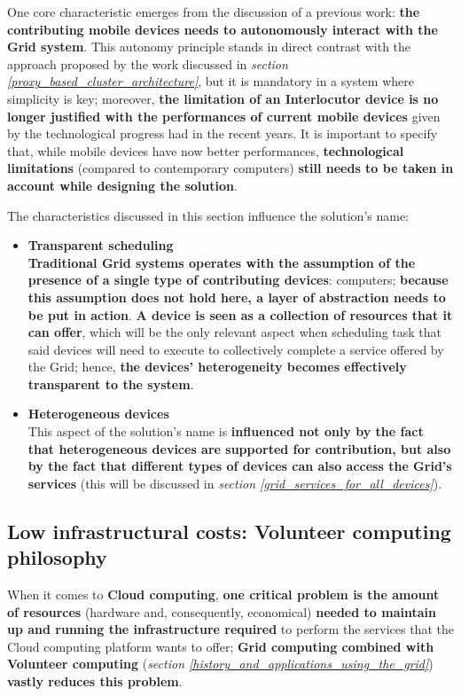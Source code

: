 One core characteristic emerges from the discussion of a previous work: \textbf{the contributing mobile devices needs to autonomously interact with the Grid system}.
This autonomy principle stands in direct contrast with the approach proposed by the work discussed in \textit{section \ref{proxy_based_cluster_architecture}}, but it is mandatory in a system where simplicity is key; moreover, \textbf{the limitation of an Interlocutor device is no longer justified with the performances of current mobile devices} given by the technological progress had in the recent years. It is important to specify that, while mobile devices have now better performances, \textbf{technological limitations} (compared to contemporary computers) \textbf{still needs to be taken in account while designing the solution}.

The characteristics discussed in this section influence the solution's name:
\begin{itemize}
    \item \textbf{Transparent scheduling}\\
    \textbf{Traditional Grid systems operates with the assumption of the presence of a single type of contributing devices}: computers; \textbf{because this assumption does not hold here, a layer of abstraction needs to be put in action}. \textbf{A device is seen as a collection of resources that it can offer}, which will be the only relevant aspect when scheduling task that said devices will need to execute to collectively complete a service offered by the Grid; hence, \textbf{the devices' heterogeneity becomes effectively transparent to the system}.
    \item \textbf{Heterogeneous devices}\\
    This aspect of the solution's name is \textbf{influenced not only by the fact that heterogeneous devices are supported for contribution, but also by the fact that different types of devices can also access the Grid's services} (this will be discussed in \textit{section \ref{grid_services_for_all_devices}}).
\end{itemize}

\subsection{Low infrastructural costs: Volunteer computing philosophy}\label{low_infrastructural_costs_volunteer_computing_philosophy}
When it comes to \textbf{Cloud computing}, \textbf{one critical problem is the amount of resources} (hardware and, consequently, economical) \textbf{needed to maintain up and running the infrastructure required} to perform the services that the Cloud computing platform wants to offer; \textbf{Grid computing combined with Volunteer computing} (\textit{section \ref{history_and_applications_using_the_grid}}) \textbf{vastly reduces this problem}.

